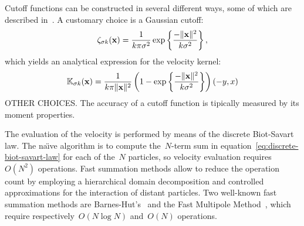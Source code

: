 Cutoff functions can be constructed in several different ways,
some of which are described in~\cite[\S2.3]{cottet00}.
A customary choice is a Gaussian cutoff:
\begin{equation}
  \zeta_{\sigma k}(\mathbf x) =
    \frac{1}{k\pi\sigma^2}
    \exp\left\{\frac{-\lVert\mathbf x\rVert^2}{k\sigma^2}\right\},
\end{equation}
which yields an analytical expression for the velocity kernel:
\begin{equation}
  \mathbb{K}_{\sigma k}(\mathbf x) =
    \frac{1}{k\pi\lVert\mathbf x\rVert^2}
    \left(
      1 - \exp\left\{
        \frac{-\lVert\mathbf x\rVert^2}{k\sigma^2}
      \right\}
    \right)
    (-y, x)
\end{equation}
OTHER CHOICES.
The accuracy of a cutoff function is tipically measured by its moment properties.

The evaluation of the velocity is performed by means of
the discrete Biot-Savart law.
The na\"{\i}ve algorithm is
to compute the~\(N\)-term sum in equation~\ref{eq:discrete-biot-savart-law}
for each of the~\(N\) particles,
so velocity evaluation requires~\(O(N^2)\) operations.
Fast summation methods allow to reduce the operation count
by employing a hierarchical domain decomposition and
controlled approximations for the interaction of distant particles.
Two well-known fast summation methods are
Barnes-Hut's~\cite{barnes86} and
the Fast Multipole Method~\cite{greengard87},
which require respectively~\(O(N\log N)\) and~\(O(N)\) operations.



